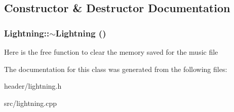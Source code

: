 \subsection{Constructor \& Destructor Documentation}
\hypertarget{classLightning_aa42fc3f22b3f0234067b92dee0daa46f}{
\subsubsection[{$\sim$Lightning}]{\setlength{\rightskip}{0pt plus 5cm}Lightning::$\sim$Lightning ()}}
\label{classLightning_aa42fc3f22b3f0234067b92dee0daa46f}


Here is the free function to clear the memory saved for the music file 

The documentation for this class was generated from the following files:\begin{DoxyCompactItemize}
\item 
header/lightning.h\item 
src/lightning.cpp\end{DoxyCompactItemize}
